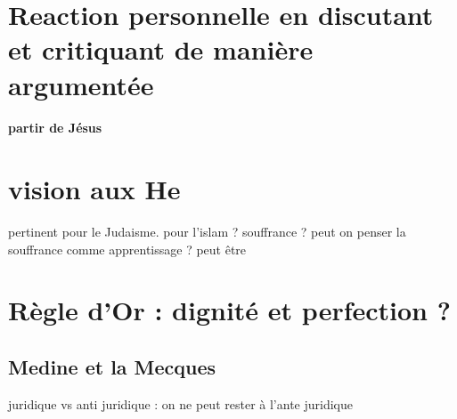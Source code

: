 \section{Reaction personnelle en discutant et critiquant de manière argumentée}

\paragraph{partir de Jésus}


\section{vision aux He} pertinent pour le Judaisme. pour l'islam ?
souffrance ? peut on penser la souffrance comme apprentissage ? peut être 
 

\section{Règle d'Or : dignité et perfection ? }

 \subsection{Medine et la Mecques} juridique vs anti juridique : on ne peut rester à l'ante juridique



 






